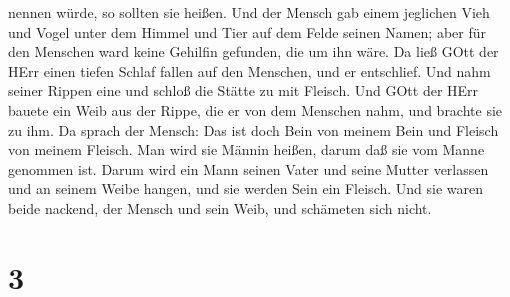 nennen würde, so sollten sie heißen.  Und der Mensch gab
einem jeglichen Vieh und Vogel unter dem Himmel und Tier auf dem Felde
seinen Namen; aber für den Menschen ward keine Gehilfin gefunden, die um
ihn wäre.  Da ließ GOtt der HErr einen tiefen Schlaf fallen
auf den Menschen, und er entschlief. Und nahm seiner Rippen eine und
schloß die Stätte zu mit Fleisch.  Und GOtt der HErr bauete
ein Weib aus der Rippe, die er von dem Menschen nahm, und brachte sie zu
ihm.  Da sprach der Mensch: Das ist doch Bein von meinem
Bein und Fleisch von meinem Fleisch. Man wird sie Männin heißen, darum
daß sie vom Manne genommen ist.  Darum wird ein Mann seinen
Vater und seine Mutter verlassen und an seinem Weibe hangen, und sie
werden Sein ein Fleisch.  Und sie waren beide nackend, der
Mensch und sein Weib, und schämeten sich nicht.

\hypertarget{section-2}{%
\section{3}\label{section-2}}

